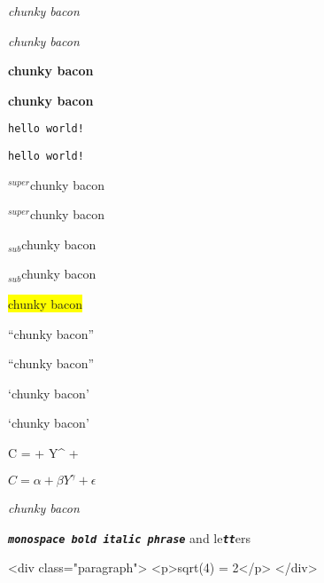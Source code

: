
\emph{chunky bacon}

\emph{chunky bacon}

\textbf{chunky bacon}

\textbf{chunky bacon}

{\tt hello world!}

{\tt hello world!}

${}^{super}$chunky bacon

${}^{super}$chunky bacon

${}_{sub}$chunky bacon

${}_{sub}$chunky bacon

\colorbox{yellow}{ chunky bacon}

``chunky bacon''

``chunky bacon''

`chunky bacon'

`chunky bacon'

C = \alpha + \beta Y^{\gamma} + \epsilon

$C = \alpha + \beta Y^{\gamma} + \epsilon$

\emph{chunky bacon}

{\tt \textbf{\emph{monospace bold italic phrase}}} and le{\tt \textbf{\emph{tt}}}ers

<div class="paragraph">
<p>sqrt(4) = 2</p>
</div>
